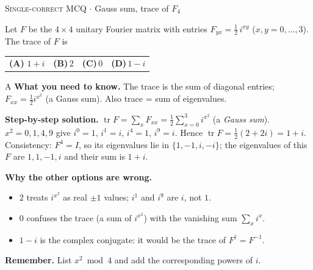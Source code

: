 \documentclass[11pt,a4paper]{article}
\newcommand{\optlabel}[1]{\textbf{(#1)}}
\newcommand{\correctlabel}[1]{\textcolor{okgreen}{\textbf{(#1)}\,\ding{51}}}
\newenvironment{qitem}[1]{\begin{list}{}{\setlength{\leftmargin}{3.3em}\setlength{\labelwidth}{3.1em}%
  \setlength{\labelsep}{0.2em}\setlength{\topsep}{3pt}\setlength{\parsep}{3pt}}\item[\textbf{Q.#1}\hfill]}{\end{list}}
\newcommand{\qsep}{\par\vspace{2pt}{\color{black!15}\hrule}\vspace{4pt}}
\newcommand{\qmeta}[2]{{\footnotesize\color{black!60}\textsc{#1} \;$\cdot$\; #2}\par}
\begin{document}
\begin{qitem}{5}
\qmeta{Single-correct MCQ}{Gauss sum, trace of $F_4$}
Let $F$ be the $4\times4$ unitary Fourier matrix with entries $F_{yx} = \tfrac12\, i^{xy}$ ($x, y = 0, \dots, 3$).
The trace of $F$ is
\par\smallskip\noindent\begin{tabularx}{\linewidth}{@{}*{4}{L}@{}}
\correctlabel{A}\,$1 + i$ & \optlabel{B}\,$2$ & \optlabel{C}\,$0$ & \optlabel{D}\,$1 - i$
\end{tabularx}
\end{qitem}
\begin{solbox}{A}
\textbf{\color{brand}What you need to know.} The trace is the sum of diagonal entries; $F_{xx} = \frac12 i^{x^2}$ (a Gauss sum). Also trace = sum of eigenvalues.

\textbf{\color{brand}Step-by-step solution.} $\operatorname{tr} F = \sum_x F_{xx} = \tfrac12\sum_{x=0}^{3} i^{x^2}$ (a \emph{Gauss sum}).
$x^2 = 0, 1, 4, 9$ give $i^0 = 1$, $i^1 = i$, $i^4 = 1$, $i^9 = i$. Hence $\operatorname{tr} F = \tfrac12(2 + 2i) = 1 + i$.
Consistency: $F^4 = I$, so its eigenvalues lie in $\{1, -1, i, -i\}$; the eigenvalues of this $F$ are $1, 1, -1, i$ and their
sum is $1 + i$.

\textbf{\color{brand}Why the other options are wrong.}
\begin{itemize}[leftmargin=2.4em, itemsep=1pt, topsep=2pt]
\item[\textbf{(B)}] $2$ treats $i^{x^2}$ as real $\pm 1$ values; $i^1$ and $i^9$ are $i$, not $1$.
\item[\textbf{(C)}] $0$ confuses the trace (a sum of $i^{x^2}$) with the vanishing sum $\sum_x i^x$.
\item[\textbf{(D)}] $1 - i$ is the complex conjugate: it would be the trace of $F^\dagger = F^{-1}$.
\end{itemize}
\textbf{\color{brand}Remember.} List $x^2 \bmod 4$ and add the corresponding powers of $i$.
\end{solbox}
\qsep
\end{document}
